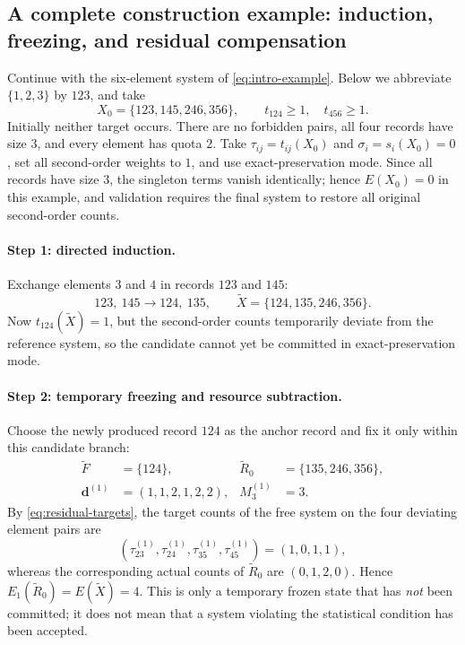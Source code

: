 \documentclass[11pt,a4paper]{article}
\numberwithin{equation}{section}
\theoremstyle{definition}
\numberwithin{algorithm}{section}
\begin{document}
\subsection{A complete construction example: induction, freezing, and residual compensation}\label{subsec:directed-example}

Continue with the six-element system of \eqref{eq:intro-example}.
Below we abbreviate $\{1,2,3\}$ by $123$, and take
\begin{equation}
X_0=\{123,145,246,356\},\qquad
t_{124}\ge1,\quad t_{456}\ge1.
\label{eq:directed-example-initial}
\end{equation}
Initially neither target occurs.
There are no forbidden pairs, all four records have size $3$, and every element has quota
$2$.
Take $\tau_{ij}=t_{ij}(X_0)$ and $\sigma_i=s_i(X_0)=0$, set all second-order weights to
$1$, and use exact-preservation mode.
Since all records have size $3$, the singleton terms vanish identically;
hence $E(X_0)=0$ in this example, and validation requires the final system to restore all
original second-order counts.

\paragraph{Step 1: directed induction.}
Exchange elements $3$ and $4$ in records $123$ and $145$:
\begin{equation}
123,\ 145\longrightarrow124,\ 135,\qquad
\widetilde X=\{124,135,246,356\}.
\label{eq:directed-example-induction}
\end{equation}
Now $t_{124}(\widetilde X)=1$, but the second-order counts temporarily deviate from the
reference system, so the candidate cannot yet be committed in exact-preservation mode.

\paragraph{Step 2: temporary freezing and resource subtraction.}
Choose the newly produced record $124$ as the anchor record and fix it only within this
candidate branch:
\begin{equation}
\begin{aligned}
\widetilde F&=\{124\},&
\widetilde R_0&=\{135,246,356\},\\
\boldsymbol d^{(1)}&=(1,1,2,1,2,2),&
M_3^{(1)}&=3.
\end{aligned}
\label{eq:level-one-example}
\end{equation}
By \eqref{eq:residual-targets}, the target counts of the free system on the four deviating
element pairs are
\[
(\tau_{23}^{(1)},\tau_{24}^{(1)},
  \tau_{35}^{(1)},\tau_{45}^{(1)})=(1,0,1,1),
\]
whereas the corresponding actual counts of $\widetilde R_0$ are $(0,1,2,0)$.
Hence $E_1(\widetilde R_0)=E(\widetilde X)=4$.
This is only a temporary frozen state that has \emph{not} been committed; it does not mean
that a system violating the statistical condition has been accepted.
\end{document}
